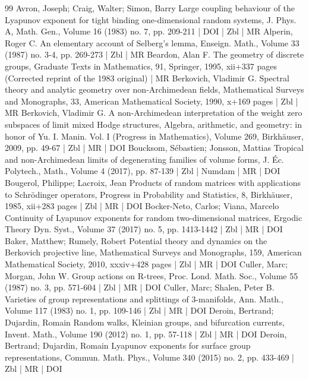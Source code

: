 \documentclass[10pt]{amsart}
\theoremstyle{definition}\newtheorem{defi}[theo]{Definition}\newtheorem{rema}[theo]{Remark}\newtheorem{exam}[theo]{Example}\newtheorem{exem}[theo]{Example}\newtheorem{nota}[theo]{Notation}
\begin{document}
\begin{thebibliography}{99}
Avron, Joseph; Craig, Walter; Simon, Barry Large coupling behaviour of the Lyapunov exponent for tight binding one-dimensional random systems, J. Phys. A, Math. Gen., Volume 16 (1983) no. 7, pp. 209-211 | DOI | Zbl | MR
Alperin, Roger C. An elementary account of Selberg’s lemma, Enseign. Math., Volume 33 (1987) no. 3-4, pp. 269-273 | Zbl | MR
Beardon, Alan F. The geometry of discrete groups, Graduate Texts in Mathematics, 91, Springer, 1995, xii+337 pages (Corrected reprint of the 1983 original) | MR
Berkovich, Vladimir G. Spectral theory and analytic geometry over non-Archimedean fields, Mathematical Surveys and Monographs, 33, American Mathematical Society, 1990, x+169 pages | Zbl | MR
Berkovich, Vladimir G. A non-Archimedean interpretation of the weight zero subspaces of limit mixed Hodge structures, Algebra, arithmetic, and geometry: in honor of Yu. I. Manin. Vol. I (Progress in Mathematics), Volume 269, Birkhäuser, 2009, pp. 49-67 | Zbl | MR | DOI
Boucksom, Sébastien; Jonsson, Mattias Tropical and non-Archimedean limits of degenerating families of volume forms, J. Éc. Polytech., Math., Volume 4 (2017), pp. 87-139 | Zbl | Numdam | MR | DOI
Bougerol, Philippe; Lacroix, Jean Products of random matrices with applications to Schrödinger operators, Progress in Probability and Statistics, 8, Birkhäuser, 1985, xii+283 pages | Zbl | MR | DOI
Bocker-Neto, Carlos; Viana, Marcelo Continuity of Lyapunov exponents for random two-dimensional matrices, Ergodic Theory Dyn. Syst., Volume 37 (2017) no. 5, pp. 1413-1442 | Zbl | MR | DOI
Baker, Matthew; Rumely, Robert Potential theory and dynamics on the Berkovich projective line, Mathematical Surveys and Monographs, 159, American Mathematical Society, 2010, xxxiv+428 pages | Zbl | MR | DOI
Culler, Marc; Morgan, John W. Group actions on R-trees, Proc. Lond. Math. Soc., Volume 55 (1987) no. 3, pp. 571-604 | Zbl | MR | DOI
Culler, Marc; Shalen, Peter B. Varieties of group representations and splittings of 3-manifolds, Ann. Math., Volume 117 (1983) no. 1, pp. 109-146 | Zbl | MR | DOI
Deroin, Bertrand; Dujardin, Romain Random walks, Kleinian groups, and bifurcation currents, Invent. Math., Volume 190 (2012) no. 1, pp. 57-118 | Zbl | MR | DOI
Deroin, Bertrand; Dujardin, Romain Lyapunov exponents for surface group representations, Commun. Math. Phys., Volume 340 (2015) no. 2, pp. 433-469 | Zbl | MR | DOI

\end{thebibliography}
\end{document}
